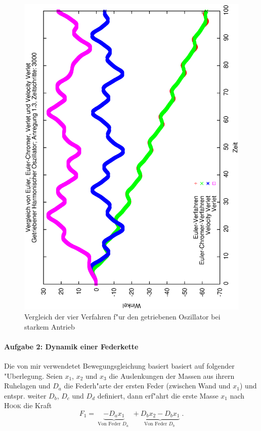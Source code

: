 \documentclass[a4paper,12pt]{article}
\begin{document}
\begin{figure}
  \centering
  \includegraphics[width=\textwidth]{vgl-awp-1}
  \caption{Vergleich der vier Verfahren f"ur den getriebenen
    Oszillator bei starkem Antrieb}
  \label{fig:vgl-awp-2}
\end{figure}
 
 
 
 

\paragraph{Aufgabe 2: Dynamik einer Federkette}
\label{sec:aufgabe_2:_dynamik_einer_federkette}

Die von mir verwendetet Bewegungsgleichung basiert basiert auf
folgender "Uberlegung. Seien $x_1$, $x_2$ und $x_3$ die Auslenkungen
der Massen aus ihrern Ruhelagen und $D_a$ die Federh"arte der ersten
Feder (zwischen Wand und $x_1$) und entspr. weiter $D_b$, $D_c$ und
$D_d$ definiert, dann erf"ahrt die erste Masse $x_1$ nach
\textsc{Hook} die Kraft
\begin{equation}
  \label{eq:1}
 F_1 =  \underbrace{ -D_a x_1 }_\text{ Von Feder $D_a$ } +
 \underbrace{ D_b x_2
    - D_b x_1 }_\text{ Von Feder $D_b$ } \;.
\end{equation}
\end{document}

